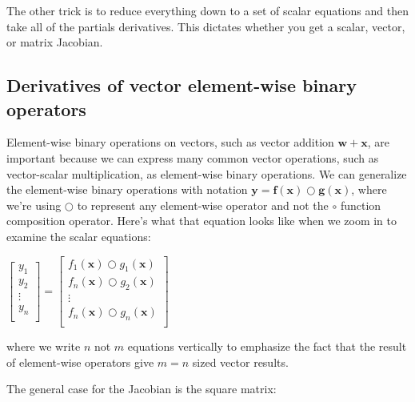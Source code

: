 \documentclass[11pt]{article}
\begin{document}
The other trick is to reduce everything down to a set of scalar equations and then take all of the partials derivatives. This dictates whether you get a scalar, vector, or matrix Jacobian.

\subsection{Derivatives of vector element-wise binary operators}

Element-wise binary operations on vectors, such as vector addition $\mathbf{w} + \mathbf{x}$, are important because we can express many common vector operations, such as vector-scalar multiplication, as element-wise binary operations.  We can generalize the element-wise binary operations with notation $\mathbf{y} = \mathbf{f(x)} \bigcirc \mathbf{g(x)}$, where we're using $\bigcirc$ to represent any element-wise operator and not the $\circ$ function composition operator.  Here's what that equation looks like when we zoom in to examine the scalar equations:

$\begin{bmatrix}
           y_1\\
           y_2\\
           \vdots \\
           y_n\\
           \end{bmatrix} = \begin{bmatrix}
           f_{1}(\mathbf{x}) \bigcirc g_{1}(\mathbf{x})\\
           f_{n}(\mathbf{x}) \bigcirc g_{2}(\mathbf{x})\\
           \vdots \\
           f_{n}(\mathbf{x}) \bigcirc g_{n}(\mathbf{x})\\
         \end{bmatrix}$

where we write $n$ not $m$ equations vertically to emphasize the fact that the result of element-wise operators give $m=n$ sized vector results.

The general case for the Jacobian is the square matrix:
\end{document}
